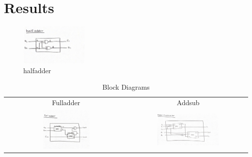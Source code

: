 \documentclass[11pt]{article}
\begin{document}
\section*{Results}


 \begin{figure}[ht]\centering
 	\caption*{halfadder}
	\includegraphics [width=0.3\textwidth,trim=0 0 0 0, clip]{halfadder_blockdiagram}
\end{figure}

\begin{table}[h]\centering
	\begin{tabular}{cc}
		Fulladder & Addsub \\
		\includegraphics [width=0.4\textwidth,trim=0 0 0 0, clip]{fulladder_blockdiagram} &
		\includegraphics [width=0.55\textwidth,trim=0 0 0 0, clip]{addsub_blockdiagram} \\
	\end{tabular}
	\caption{Block Diagrams}
	\label{fig:sim_with_table}
\end{table}
\end{document}
